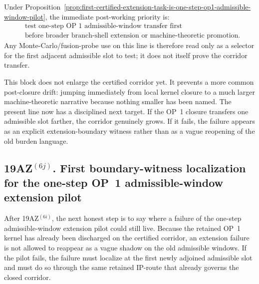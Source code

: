 \begin{corollary}
\label{cor:normalized-immediate-working-priority-after-retained-kernel-closures}
Under Proposition~\ref{prop:first-certified-extension-task-is-one-step-op1-admissible-window-pilot}, the immediate post-working priority is:
\[
\begin{aligned}
&\text{test one-step OP~1 admissible-window transfer first}\\
&\text{before broader branch-shell extension or machine-theoretic promotion.}
\end{aligned}
\]
Any Monte-Carlo/fusion-probe use on this line is therefore read only as a selector for the first adjacent admissible slot to test; it does not itself prove the corridor transfer.
\end{corollary}

\begin{remark}
\label{rem:what-first-certified-extension-pilot-buys}
This block does not enlarge the certified corridor yet. It prevents a more common post-closure drift: jumping immediately from local kernel closure to a much larger machine-theoretic narrative because nothing smaller has been named. The present line now has a disciplined next target. If the OP~1 closure transfers one admissible slot farther, the corridor genuinely grows. If it fails, the failure appears as an explicit extension-boundary witness rather than as a vague reopening of the old burden language.
\end{remark}


\subsection*{19AZ$^{(6j)}$. First boundary-witness localization for the one-step OP~1 admissible-window extension pilot}
\label{sec:first-boundary-witness-localization-one-step-op1-admissible-window-extension-pilot}
After 19AZ$^{(6i)}$, the next honest step is to say where a failure of the one-step admissible-window extension pilot could still live. Because the retained OP~1 kernel has already been discharged on the certified corridor, an extension failure is not allowed to reappear as a vague shadow on the old admissible windows. If the pilot fails, the failure must localize at the first newly adjoined admissible slot and must do so through the same retained IP-route that already governs the closed corridor.

